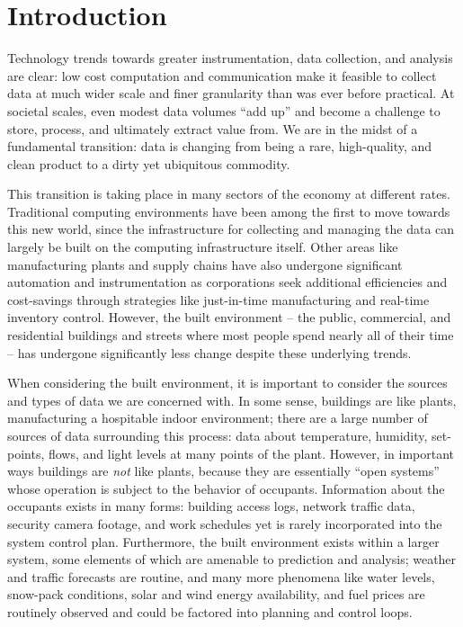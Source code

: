 \section{Introduction}
Technology trends towards greater instrumentation, data collection, and analysis are clear: low cost computation and communication make it feasible to collect data at much wider scale and finer granularity than was ever before practical.  At societal scales, even modest data volumes ``add up'' and become a challenge to store, process, and ultimately extract value from.  We are in the midst of a fundamental transition: data is changing from being a rare, high-quality, and clean product to a dirty yet ubiquitous commodity.  

This transition is taking place in many sectors of the economy at different rates.  Traditional computing environments have been among the first to move towards this new world, since the infrastructure for collecting and managing the data can largely be built on the computing infrastructure itself.  Other areas like manufacturing plants and supply chains have also undergone significant automation and instrumentation as corporations seek additional efficiencies and cost-savings through strategies like just-in-time manufacturing and real-time inventory control.  However, the built environment -- the public, commercial, and residential buildings and streets where most people spend nearly all of their time -- has undergone significantly less change despite these underlying trends.

When considering the built environment, it is important to consider the sources and types of data we are concerned with.  In some sense, buildings are like plants, manufacturing a hospitable indoor environment; there are a large number of sources of data surrounding this process: data about temperature, humidity, set-points, flows, and light levels at many points of the plant.  However, in important ways buildings are {\it not} like plants, because they are essentially ``open systems'' whose operation is subject to the behavior of occupants.  Information about the occupants exists in many forms: building access logs, network traffic data, security camera footage, and work schedules yet is rarely incorporated into the system control plan.  Furthermore, the built environment exists within a larger system, some elements of which are amenable to prediction and analysis; weather and traffic forecasts are routine, and many more phenomena like water levels, snow-pack conditions, solar and wind energy availability, and fuel prices are routinely observed and could be factored into planning and control loops.

